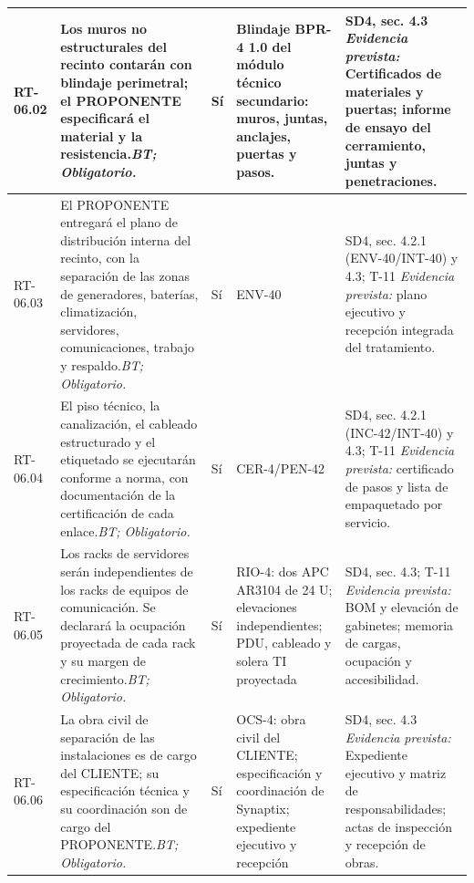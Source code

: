 \begin{paginaHorizontalSynaptix}
\begin{longtable}{|L{0.09\AnchoMatrizTDoce}|L{0.385\AnchoMatrizTDoce}|L{0.065\AnchoMatrizTDoce}|L{0.18\AnchoMatrizTDoce}|L{0.28\AnchoMatrizTDoce}|}
RT-\allowbreak{}06.\allowbreak{}02 &
Los muros no estructurales del recinto contarán con blindaje perimetral; el PROPONENTE especificará el material y la resistencia.\newline\textit{BT; Obligatorio.} &
Sí &
Blindaje BPR-4 1.0 del módulo técnico secundario: muros, juntas, anclajes, puertas y pasos. &
SD4, sec. 4.3 \newline\textit{Evidencia prevista:} Certificados de materiales y puertas; informe de ensayo del cerramiento, juntas y penetraciones. \\ \hline

RT-\allowbreak{}06.\allowbreak{}03 &
El PROPONENTE entregará el plano de distribución interna del recinto, con la separación de las zonas de generadores, baterías, climatización, servidores, comunicaciones, trabajo y respaldo.\newline\textit{BT; Obligatorio.} &
Sí &
ENV-40 &
SD4, sec. 4.2.1 (ENV-40/INT-40) y 4.3; T-11 \newline\textit{Evidencia prevista:} plano ejecutivo y recepción integrada del tratamiento. \\ \hline

RT-\allowbreak{}06.\allowbreak{}04 &
El piso técnico, la canalización, el cableado estructurado y el etiquetado se ejecutarán conforme a norma, con documentación de la certificación de cada enlace.\newline\textit{BT; Obligatorio.} &
Sí &
CER-4/\allowbreak{}PEN-42 &
SD4, sec. 4.2.1 (INC-42/INT-40) y 4.3; T-11 \newline\textit{Evidencia prevista:} certificado de pasos y lista de empaquetado por servicio. \\ \hline

RT-\allowbreak{}06.\allowbreak{}05 &
Los racks de servidores serán independientes de los racks de equipos de comunicación. Se declarará la ocupación proyectada de cada rack y su margen de crecimiento.\newline\textit{BT; Obligatorio.} &
Sí &
RIO-4: dos APC AR3104 de 24 U; elevaciones independientes; PDU, cableado y solera TI proyectada &
SD4, sec. 4.3; T-11 \newline\textit{Evidencia prevista:} BOM y elevación de gabinetes; memoria de cargas, ocupación y accesibilidad. \\ \hline

RT-\allowbreak{}06.\allowbreak{}06 &
La obra civil de separación de las instalaciones es de cargo del CLIENTE; su especificación técnica y su coordinación son de cargo del PROPONENTE.\newline\textit{BT; Obligatorio.} &
Sí &
OCS-4: obra civil del CLIENTE; especificación y coordinación de Synaptix; expediente ejecutivo y recepción &
SD4, sec. 4.3 \newline\textit{Evidencia prevista:} Expediente ejecutivo y matriz de responsabilidades; actas de inspección y recepción de obras. \\ \hline


\end{longtable}
\end{paginaHorizontalSynaptix}
